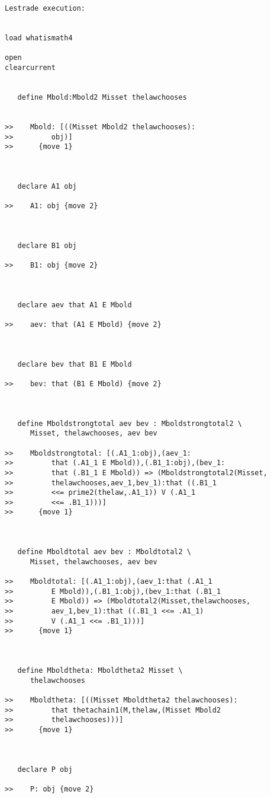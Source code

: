\documentclass[12pt]{article}
\begin{document}
\begin{verbatim}Lestrade execution:


load whatismath4

open
clearcurrent


   define Mbold:Mbold2 Misset thelawchooses


>>    Mbold: [((Misset Mbold2 thelawchooses):
>>         obj)]
>>      {move 1}



   declare A1 obj

>>    A1: obj {move 2}



   declare B1 obj

>>    B1: obj {move 2}



   declare aev that A1 E Mbold

>>    aev: that (A1 E Mbold) {move 2}



   declare bev that B1 E Mbold

>>    bev: that (B1 E Mbold) {move 2}



   define Mboldstrongtotal aev bev : Mboldstrongtotal2 \
      Misset, thelawchooses, aev bev

>>    Mboldstrongtotal: [(.A1_1:obj),(aev_1:
>>         that (.A1_1 E Mbold)),(.B1_1:obj),(bev_1:
>>         that (.B1_1 E Mbold)) => (Mboldstrongtotal2(Misset,
>>         thelawchooses,aev_1,bev_1):that ((.B1_1
>>         <<= prime2(thelaw,.A1_1)) V (.A1_1
>>         <<= .B1_1)))]
>>      {move 1}



   define Mboldtotal aev bev : Mboldtotal2 \
      Misset, thelawchooses, aev bev

>>    Mboldtotal: [(.A1_1:obj),(aev_1:that (.A1_1
>>         E Mbold)),(.B1_1:obj),(bev_1:that (.B1_1
>>         E Mbold)) => (Mboldtotal2(Misset,thelawchooses,
>>         aev_1,bev_1):that ((.B1_1 <<= .A1_1)
>>         V (.A1_1 <<= .B1_1)))]
>>      {move 1}



   define Mboldtheta: Mboldtheta2 Misset \
      thelawchooses

>>    Mboldtheta: [((Misset Mboldtheta2 thelawchooses):
>>         that thetachain1(M,thelaw,(Misset Mbold2
>>         thelawchooses)))]
>>      {move 1}



   declare P obj

>>    P: obj {move 2}




\end{verbatim}
\end{document}
